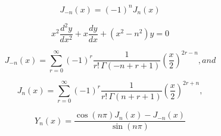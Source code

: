 \[\begin{equation} J_{-n}(x)=(-1)^{n}J_{n}(x) \end{equation}\]

\[\begin{equation} x^{2}{\frac {d^{2}y}{dx^{2}}}+x{\frac {dy}{dx}}+(x^{2}-n ^{2})y=0 \end{equation}\]

\[\begin{equation} \label{besselfirst1} J_{-n}(x)=\sum _{r=0}^{\infty }(-1)^r{\frac {1}{r!\,\Gamma (-n+r +1)}}{\left({\frac {x}{2}}\right)}^{2r-n }, and \end{equation}\]

\[\begin{equation} \label{besselfirstn} J_{n }(x)=\sum _{r=0}^{\infty }(-1)^r{\frac {1}{r!\,\Gamma (n+r +1)}}{\left({\frac {x}{2}}\right)}^{2r+n }, \end{equation}\]

\[\begin{equation} \label{besselsecond} Y_{n }(x)={\frac {\cos(n \pi )J_n(x)-J_{-n }(x)}{\sin(n \pi )}} \end{equation}\]

